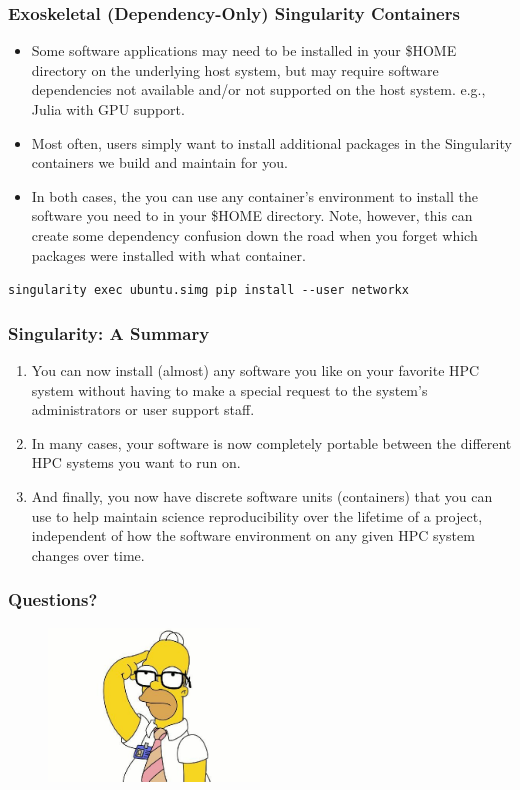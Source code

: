 \documentclass{beamer}
\begin{document}
\begin{frame}
   \frametitle{Exoskeletal (Dependency-Only) Singularity Containers}
   \begin{itemize}
      \setlength\itemsep{1.0em}
      \item Some software applications may need to be installed in your 
         \$HOME directory on the underlying host system, but may require 
         software dependencies not available and/or not supported on the 
         host system. e.g., Julia with GPU support.
      \item Most often, users simply want to install additional packages 
         in the Singularity containers we build and maintain for you.
      \item In both cases, the you can use any container's environment to 
         install the software you need to in your \$HOME directory. 
         Note, however, this can create some dependency confusion down 
         the road when you forget which packages were installed with 
         what container. 
   \end{itemize}
   \lstinline{singularity exec ubuntu.simg pip install --user networkx}
\end{frame}

\begin{frame}
   \frametitle{Singularity: A Summary}
   \begin{enumerate}
      \setlength\itemsep{1.0em}
      \item You can now install (almost) any software you like on your 
         favorite HPC system without having to make a special request 
         to the system's administrators or user support staff.
      \item In many cases, your software is now completely portable 
         between the different HPC systems you want to run on.
      \item And finally, you now have discrete software units 
         (containers) that you can use to help maintain science 
         reproducibility over the lifetime of a project, independent of 
         how the software environment on any given HPC system changes 
         over time.
   \end{enumerate}
\end{frame}

\begin{frame}
   \frametitle{Questions?}
   \vspace{-1.0em}
   \begin{figure}[htbp]
      \includegraphics[width=0.5\textwidth]{images/homer-simpson-glasses.jpg}
   \end{figure}
\end{frame}
\end{document}

